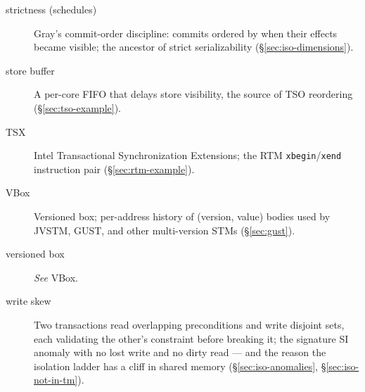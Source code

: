 \begin{description}
    \item[strictness (schedules)]  Gray's commit-order discipline: commits ordered by when their effects became visible; the ancestor of strict serializability (\S\ref{sec:iso-dimensions}).
    \item[store buffer]  A per-core FIFO that delays store
          visibility, the source of TSO reordering (\S\ref{sec:tso-example}).
    \item[TSX]  Intel Transactional Synchronization Extensions; the
          RTM \texttt{xbegin}/\texttt{xend} instruction pair
          (\S\ref{sec:rtm-example}).
    \item[VBox]  Versioned box; per-address history of
          (version, value) bodies used by JVSTM, GUST, and other multi-version
          STMs (\S\ref{sec:gust}).
    \item[versioned box]  \emph{See} VBox.
    \item[write skew]  Two transactions read overlapping preconditions and write disjoint sets, each validating the other's constraint before breaking it; the signature SI anomaly with no lost write and no dirty read --- and the reason the isolation ladder has a cliff in shared memory (\S\ref{sec:iso-anomalies}, \S\ref{sec:iso-not-in-tm}).
\end{description}


